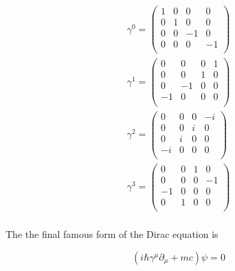 \begin{equation*}
    \begin{gathered}
        \gamma^{0} = 
         \begin{pmatrix}
          1 & 0 & 0 & 0 \\
          0 & 1 & 0 & 0 \\
          0 & 0 & -1 & 0 \\
          0 & 0 & 0 & -1 \\
         \end{pmatrix} \\
        \gamma^{1} = 
         \begin{pmatrix}
          0 & 0 & 0 & 1 \\
          0 & 0 & 1 & 0 \\
          0 & -1 & 0 & 0 \\
          -1 & 0 & 0 & 0 \\
         \end{pmatrix} \\
        \gamma^{2} = 
         \begin{pmatrix}
          0 & 0 & 0 & -i \\
          0 & 0 & i & 0 \\
          0 & i & 0 & 0 \\
          -i & 0 & 0 & 0 \\
         \end{pmatrix} \\
        \gamma^{3} = 
         \begin{pmatrix}
          0 & 0 & 1 & 0 \\
          0 & 0 & 0 & -1 \\
          -1 & 0 & 0 & 0 \\
          0 & 1 & 0 & 0 \\
         \end{pmatrix} \\
    \end{gathered}
\end{equation*}

The the final famous form of the Dirac equation is

\begin{equation}
    \label{eq:dirac_original}
    ( i \hbar \gamma^{\mu} \partial_{\mu} + mc) \psi = 0
\end{equation}
